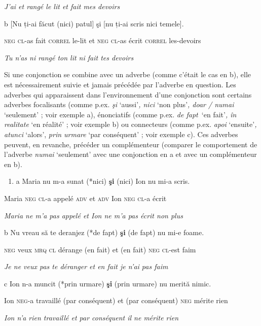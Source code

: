 {\itshape
J'ai et rangé le lit et fait mes devoirs}

  b  [Nu  ți-ai  făcut  (nici)  patul]  şi  [nu  ți-ai  scris  nici  temele].

    \textsc{neg  cl}-as  fait  \textsc{correl}  le-lit  et  \textsc{neg  cl}-as  écrit  \textsc{correl } les-devoirs

    \textit{Tu n'as ni rangé ton lit ni fait tes devoirs}

Si une conjonction se combine avec un adverbe (comme c'était le cas en b), elle est nécessairement suivie et jamais précédée par l'adverbe en question. Les adverbes qui apparaissent dans l'environnement d'une conjonction sont certains adverbes focalisants (comme p.ex. \textit{şi} `aussi'\textit{, nici} `non plus'\textit{, doar / numai} `seulement' ; voir exemple a), énonciatifs (comme p.ex. \textit{de fapt~}`en fait'\textit{, în realitate} `en réalité' ; voir exemple b) ou connecteurs (comme p.ex. \textit{apoi} `ensuite'\textit{, atunci} `alors', \textit{prin urmare} `par conséquent' ; voir exemple c). Ces adverbes peuvent, en revanche, précéder un complémenteur (comparer le comportement de l'adverbe \textit{numai} `seulement' avec une conjonction en a et avec un complémenteur en b). 


\begin{enumerate}
\item \label{bkm:Ref300169766}a  Maria  nu  m-a  sunat  (*nici)  \textbf{şi } (nici)  Ion  nu  mi-a  scris.


\end{enumerate}
Maria  \textsc{neg  cl-}a  appelé  \textsc{adv}  et  \textsc{adv}  Ion  \textsc{neg  cl}-a  écrit 

{\itshape
Maria ne m'a pas appelé et Ion ne m'a pas écrit non plus}

  b  Nu  vreau  să  te  deranjez  (*de fapt)  \textbf{şi}  (de fapt)  nu  mi-e  foame.

    \textsc{neg}  veux  \textsc{mrq  cl}  dérange  (en fait)  et  (en fait)  \textsc{neg  cl}-est  faim

    \textit{Je ne veux pas te déranger et en fait je n'ai pas faim}

  c  Ion  n-a  muncit  (*prin urmare)  \textbf{şi}  (prin urmare)  nu  merită  nimic.

    Ion  \textsc{neg}-a  travaillé  (par conséquent)  et  (par conséquent)  \textsc{neg}  mérite  rien

{\itshape
    Ion n'a rien travaillé et par conséquent il ne mérite rien}


